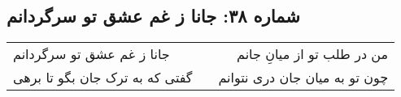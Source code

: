 \begin{center}
\section*{شماره ۳۸: جانا ز غم عشق تو سرگردانم}
\label{sec:038}
\begin{longtable}{l p{0.5cm} r}
جانا ز غم عشق تو سرگردانم
&&
من در طلب تو از میانِ جانم
\\
گفتی که به ترک جان بگو تا برهی
&&
چون تو به میان جان دری نتوانم
\\
\end{longtable}
\end{center}
